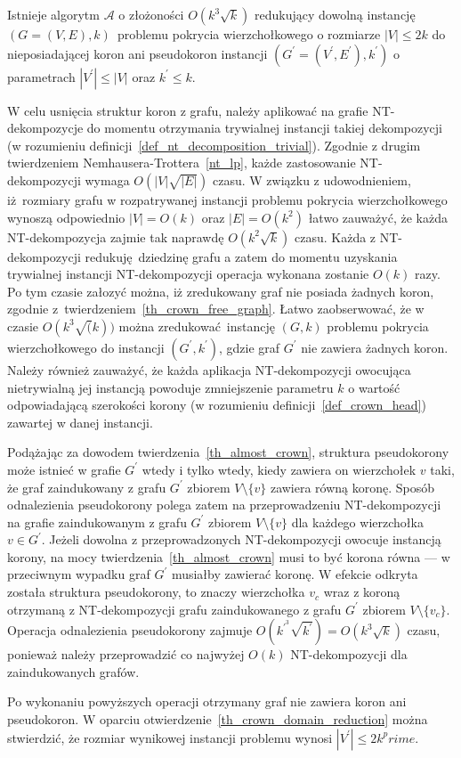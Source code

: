 {  \begin{theorem}
    Istnieje algorytm $\mathcal{A}$ o złożoności $O(k^3\sqrt{k})$ redukujący dowolną instancję $(G=(V, E), k)$ problemu pokrycia wierzchołkowego o rozmiarze $|V|\leq 2k$ do nieposiadającej koron ani pseudokoron instancji $(G^\prime=(V^\prime, E^\prime), k^\prime)$ o parametrach $|V^\prime| \leq |V|$ oraz $k^\prime \leq k$.
  \end{theorem}
  \begin{bproof}
    W celu usnięcia struktur koron z grafu, należy aplikować na grafie NT-dekompozycje do momentu otrzymania trywialnej instancji takiej dekompozycji (w rozumieniu definicji~\ref{def_nt_decomposition_trivial}).
    Zgodnie z drugim twierdzeniem Nemhausera-Trottera~\ref{nt_lp}, każde zastosowanie NT-dekompozycji wymaga $O(|V|\sqrt{|E|})$ czasu.
    W związku z udowodnieniem, iż rozmiary grafu w rozpatrywanej instancji problemu pokrycia wierzchołkowego wynoszą odpowiednio $|V|=O(k)$ oraz $|E|=O(k^2)$ łatwo zauważyć, że każda NT-dekompozycja zajmie tak naprawdę $O(k^2\sqrt{k})$ czasu.
    Każda z NT-dekompozycji redukuję dziedzinę grafu a zatem do momentu uzyskania trywialnej instancji NT-dekompozycji operacja wykonana zostanie $O(k)$ razy.
    Po tym czasie załozyć można, iż zredukowany graf nie posiada żadnych koron, zgodnie z~twierdzeniem~\ref{th_crown_free_graph}.
    Łatwo zaobserwować, że w czasie $O(k^3\sqrt(k))$ można zredukować instancję $(G, k)$ problemu pokrycia wierzchołkowego do instancji $(G^\prime, k^\prime)$, gdzie graf $G^\prime$ nie zawiera żadnych koron.
    Należy również zauważyć, że każda aplikacja NT-dekompozycji owocująca nietrywialną jej instancją powoduje zmniejszenie parametru $k$ o wartość odpowiadającą szerokości korony (w rozumieniu definicji~\ref{def_crown_head}) zawartej w danej instancji.

    Podążając za dowodem twierdzenia~\ref{th_almost_crown}, struktura pseudokorony może istnieć w grafie $G^\prime$ wtedy i tylko wtedy, kiedy zawiera on wierzchołek $v$ taki, że graf zaindukowany z grafu $G^\prime$ zbiorem $V \setminus \{v\}$ zawiera równą koronę.
    Sposób odnalezienia pseudokorony polega zatem na przeprowadzeniu NT-dekompozycji na grafie zaindukowanym z grafu $G^\prime$ zbiorem $V \setminus \{v\}$ dla każdego wierzchołka $v \in G^\prime$.
    Jeżeli dowolna z przeprowadzonych NT-dekompozycji owocuje instancją korony, na mocy twierdzenia~\ref{th_almost_crown} musi to być korona równa --- w przeciwnym wypadku graf $G^\prime$ musiałby zawierać koronę.
    W efekcie odkryta została struktura pseudokorony, to znaczy wierzchołka $v_c$ wraz z koroną otrzymaną z NT-dekompozycji grafu zaindukowanego z grafu $G^\prime$ zbiorem $V \setminus \{v_c\}$.
    Operacja odnalezienia pseudokorony zajmuje $O(k^{\prime}^3\sqrt{k^\prime})=O(k^3\sqrt{k})$ czasu, ponieważ należy przeprowadzić co najwyżej $O(k)$ NT-dekompozycji dla zaindukowanych grafów.

    Po wykonaniu powyższych operacji otrzymany graf nie zawiera koron ani pseudokoron.
    W oparciu  otwierdzenie~\ref{th_crown_domain_reduction} można stwierdzić, że rozmiar wynikowej instancji problemu wynosi $|V^\prime| \leq 2k^prime$.
  \end{bproof}
}
